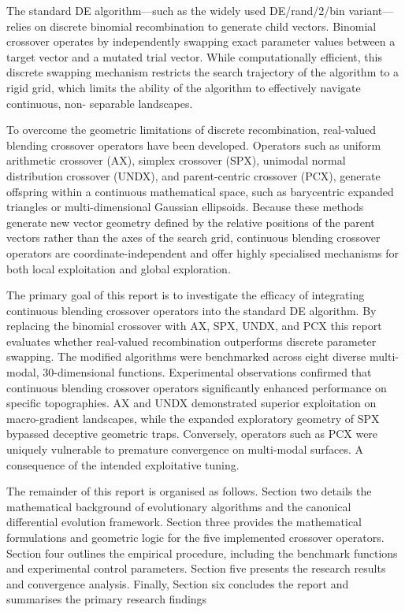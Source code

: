 \documentclass[conference]{IEEEtran}
\begin{document}
    The standard DE algorithm---such as the widely used DE/rand/2/bin variant---relies on discrete 
    binomial recombination to generate child vectors. Binomial crossover operates by independently swapping exact parameter values between a target vector and a mutated trial vector. While computationally efficient, this discrete swapping mechanism restricts the search trajectory 
    of the algorithm to a rigid grid, which limits the ability of the algorithm to effectively navigate continuous, non-
    separable landscapes.

    To overcome the geometric limitations of discrete recombination, real-valued blending 
    crossover operators have been developed. Operators such as uniform arithmetic crossover (AX), 
    simplex crossover (SPX), unimodal normal distribution crossover (UNDX), and parent-centric crossover (PCX), generate offspring within a continuous mathematical space, such as barycentric 
    expanded triangles or multi-dimensional Gaussian ellipsoids. Because these methods generate new vector geometry defined by the relative positions of the parent vectors rather than the 
    axes of the search grid, continuous blending crossover operators are coordinate-independent and offer highly 
    specialised mechanisms for both 
    local exploitation and global exploration. 

    The primary goal of this report is to investigate the efficacy of integrating continuous blending crossover operators into the standard DE algorithm. 
    By replacing the binomial crossover with AX, SPX, UNDX, and PCX this report evaluates whether real-valued recombination outperforms discrete parameter 
    swapping. The modified algorithms were benchmarked across eight diverse multi-modal, 30-dimensional functions. Experimental observations confirmed that continuous 
    blending crossover operators significantly enhanced performance on specific topographies. AX and UNDX demonstrated superior exploitation on macro-gradient 
    landscapes, while the expanded exploratory geometry of SPX bypassed deceptive geometric traps. Conversely, operators such as PCX were 
    uniquely vulnerable to premature convergence on multi-modal surfaces. A consequence of the intended exploitative tuning. 

   The remainder of this report is organised as follows. Section two details the mathematical background of evolutionary 
   algorithms and the canonical differential evolution framework. Section three provides the mathematical formulations 
   and geometric logic for the five implemented crossover operators. Section four outlines the empirical procedure, 
   including the benchmark functions and experimental control parameters. Section five presents the research results 
   and convergence analysis. Finally, Section six concludes the report and summarises the primary research findings 
\end{document}

